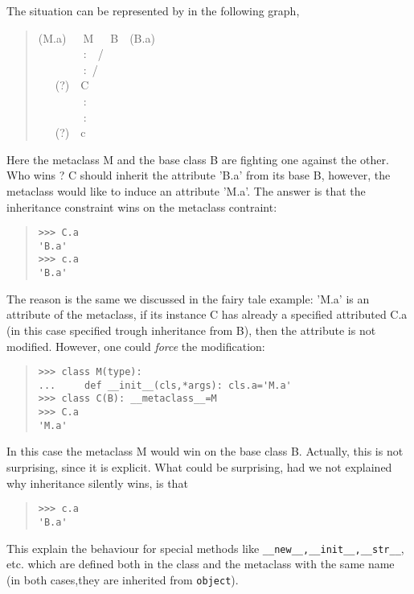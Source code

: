 \documentclass[10pt,english]{article}
\begin{document}
The situation can be represented by in the following graph,
\begin{quote}
\begin{ttfamily}\begin{flushleft}
\mbox{(M.a)~~~M~~~B~~(B.a)}\\
\mbox{~~~~~~~~:~~/}\\
\mbox{~~~~~~~~:~/}\\
\mbox{~~~(?)~~C}\\
\mbox{~~~~~~~~:}\\
\mbox{~~~~~~~~:}\\
\mbox{~~~(?)~~c}
\end{flushleft}\end{ttfamily}
\end{quote}

Here the metaclass M and the base class B are fighting one against the other.
Who wins ? C should inherit the attribute 'B.a' from its base B, however,
the metaclass would like to induce an attribute 'M.a'.
The answer is that the inheritance constraint wins on the metaclass contraint:
\begin{quote}
\begin{verbatim}>>> C.a
'B.a'
>>> c.a
'B.a'\end{verbatim}
\end{quote}

The reason is the same we discussed in the fairy tale example: 'M.a' is
an attribute of the metaclass, if its instance C has already a specified
attributed C.a (in this case specified trough inheritance from B), then
the attribute is not modified. However, one could \emph{force} the modification:
\begin{quote}
\begin{verbatim}>>> class M(type):
...     def __init__(cls,*args): cls.a='M.a'
>>> class C(B): __metaclass__=M
>>> C.a
'M.a'\end{verbatim}
\end{quote}

In this case the metaclass M would win on the base class B. Actually,
this is not surprising, since it is explicit. What could be surprising,
had we not explained why inheritance silently wins, is that
\begin{quote}
\begin{verbatim}>>> c.a
'B.a'\end{verbatim}
\end{quote}

This explain the behaviour for special methods like  
\texttt{{\_}{\_}new{\_}{\_},{\_}{\_}init{\_}{\_},{\_}{\_}str{\_}{\_}}, 
etc. which are defined both in the class and the metaclass with the same 
name (in both cases,they are inherited from \texttt{object}).
\end{document}
